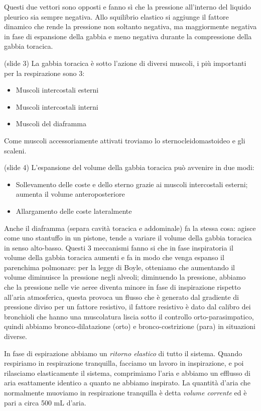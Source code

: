 \documentclass[a4paper,12pt]{article}
\begin{document}
Questi due vettori sono opposti e fanno sì che la pressione all'interno del liquido pleurico sia sempre negativa. Allo squilibrio elastico si aggiunge il fattore dinamico che rende la pressione non soltanto negativa, ma maggiormente negativa in fase di espansione della gabbia e meno negativa durante la compressione della gabbia toracica. 

(slide 3) La gabbia toracica è sotto l'azione di diversi muscoli, i più importanti per la respirazione sono 3:
\begin{itemize}
\item{Muscoli intercostali esterni}
\item{Muscoli intercostali interni}
\item{Muscoli del diaframma}
\end{itemize}

Come muscoli accessoriamente attivati troviamo lo sternocleidomastoideo e gli scaleni.

(slide 4) L'espansione del volume della gabbia toracica può avvenire in due modi:
\begin{itemize}
\item{Sollevamento delle coste e dello sterno grazie ai muscoli intercostali esterni; aumenta il volume anteroposteriore}
\item{Allargamento delle coste lateralmente}
\end{itemize}

Anche il diaframma (separa cavità toracica e addominale) fa la stessa cosa: agisce come uno stantuffo in un pistone, tende a variare il volume della gabbia toracica in senso alto-basso. Questi 3 meccanismi fanno si che in fase inspiratoria il volume della gabbia toracica aumenti e fa in modo che venga espanso il parenchima polmonare: per la legge di Boyle, otteniamo che aumentando il volume diminuisce la pressione negli alveoli; diminuendo la pressione, abbiamo che la pressione nelle vie aeree diventa minore in fase di inspirazione rispetto all'aria atmosferica, questa provoca un flusso che è generato dal gradiente di pressione diviso per un fattore resistivo, il fattore resistivo è dato dal calibro dei bronchioli che hanno una muscolatura liscia sotto il controllo orto-parasimpatico, quindi abbiamo bronco-dilatazione (orto) e bronco-costrizione (para) in situazioni diverse. 

In fase di espirazione abbiamo un \emph{ritorno elastico} di tutto il sistema. Quando respiriamo in respirazione tranquilla, facciamo un lavoro in inspirazione, e poi rilasciamo elasticamente il sistema, comprimiamo l'aria e abbiamo un efflusso di aria esattamente identico a quanto ne abbiamo inspirato. La quantità d'aria che normalmente muoviamo in respirazione tranquilla è detta \emph{volume corrente} ed è pari a circa 500 mL d'aria. 
\end{document}
